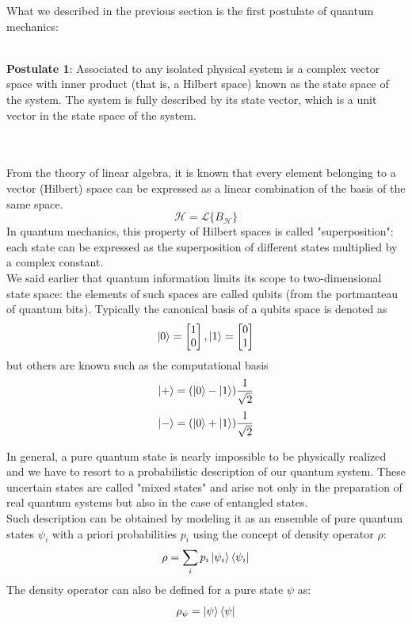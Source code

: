 \documentclass[journal, letterpaper]{IEEEtran}
\begin{document}
What we described in the previous section is the first postulate of quantum mechanics: \\ \\
\begin{minipage}{\linewidth}
    \textbf{Postulate 1}: Associated to any isolated physical system is a complex vector space with inner product (that is, a Hilbert space) known as the state space of the system. The system is fully described by its state vector, which is a unit vector in the state space of the system. \cite{chuang}
\end{minipage}\\ \\

From the theory of linear algebra, it is known that every element belonging to a vector (Hilbert) space can be expressed as a linear combination of the basis of the same space.
\[\mathscr{H} = \mathscr{L} \{B_{\mathscr{H}}\}\]
In quantum mechanics, this property of Hilbert spaces is called "superposition": each state can be expressed as the superposition of different states multiplied by a complex constant.\\
We said earlier that quantum information limits its scope to two-dimensional state space: the elements of such spaces are called qubits (from the portmanteau of quantum bits). Typically the canonical basis of a qubits space is denoted as \[\ket{0} = \begin{bmatrix}
           1 \\
           0 \\
           \end{bmatrix},
\ket{1} =  \begin{bmatrix}
           0 \\
           1 \\
           \end{bmatrix}\] 
but others are known such as the computational basis \[\ket{+} = (\ket{0} - \ket{1})\frac{1}{\sqrt{2}} \]
\[\ket{-} = (\ket{0} + \ket{1})\frac{1}{\sqrt{2}} \]

In general, a pure quantum state is nearly impossible to be physically realized and we have to resort to a probabilistic description of our quantum system. These uncertain states are called "mixed states" and arise not only in the preparation of real quantum systems but also in the case of entangled states.\\ 
Such description can be obtained by modeling it as an ensemble of pure quantum states $\psi_{i}$ with a priori probabilities $p_i$ using the concept of density operator $\rho$: 
 \[\rho = \sum_{i}p_i\ket{\psi_i}\bra{\psi_{i}}\]
The density operator can also be defined for a pure state $\psi$ as: 
\[\rho_\psi = \ket{\psi}\bra{\psi}\]
 
\end{document}
